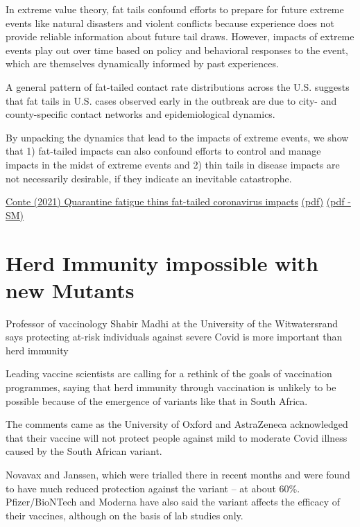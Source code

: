 \documentclass[
]{book}
\begin{document}
In extreme value theory, fat tails confound efforts to prepare for future extreme events
like natural disasters and violent conflicts because
experience does not provide reliable information about future tail draws.
However, impacts of extreme events play out over time based on policy and
behavioral responses to the event,
which are themselves dynamically informed by past experiences.

A general pattern of fat-tailed contact rate distributions across the U.S.
suggests that fat tails in U.S. cases observed early in the outbreak
are due to city- and county-specific contact networks and epidemiological dynamics.

By unpacking the dynamics that lead to the impacts of extreme events, we show that
1) fat-tailed impacts can also confound efforts to control and manage impacts
in the midst of extreme events and
2) thin tails in disease impacts are not necessarily desirable,
if they indicate an inevitable catastrophe.

\href{https://www.medrxiv.org/content/10.1101/2021.01.07.21249366v1}{Conte (2021) Quarantine fatigue thins fat-tailed coronavirus impacts}
\href{pdf/Conte_2021_Fat-tailed_Corona.pdf}{(pdf)}
\href{pdf/Conte_2021_Fat-tailed_Corona_SM.pdf}{(pdf - SM)}

\hypertarget{herd-immunity-impossible-with-new-mutants}{%
\section{Herd Immunity impossible with new Mutants}\label{herd-immunity-impossible-with-new-mutants}}

Professor of vaccinology Shabir Madhi at the University of the Witwatersrand says protecting at-risk individuals against severe Covid is more important than herd immunity

Leading vaccine scientists are calling for a rethink of the goals of vaccination programmes, saying that herd immunity through vaccination is unlikely to be possible because of the emergence of variants like that in South Africa.

The comments came as the University of Oxford and AstraZeneca acknowledged that their vaccine will not protect people against mild to moderate Covid illness caused by the South African variant.

Novavax and Janssen, which were trialled there in recent months and were found to have much reduced protection against the variant -- at about 60\%. Pfizer/BioNTech and Moderna have also said the variant affects the efficacy of their vaccines, although on the basis of lab studies only.
\end{document}
